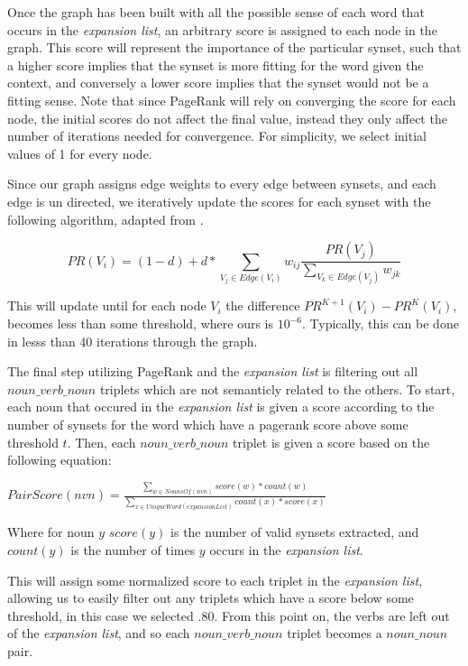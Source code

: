 \documentclass[11pt]{article}
\begin{document}
Once the graph has been built with all the possible sense of each word that
occurs in the \emph{expansion list}, an arbitrary score is assigned to each node in the
graph.  This score will represent the importance of the particular synset, such
that a higher score implies that the synset is more fitting for the word given
the context, and conversely a lower score implies that the synset would not be a
fitting sense.  Note that since PageRank will rely on converging the score for
each node, the initial scores do not affect the final value, instead they only
affect the number of iterations needed for convergence.  For simplicity, we
select initial values of 1 for every node.  

Since our graph assigns edge weights to every edge between 
synsets, and each edge is un directed, we iteratively update the scores for each
synset with the following algorithm, adapted from \cite{mihalcea06randomwalks}.   

\small
\[PR(V_i) = (1-d) + d*\sum_{V_j \in Edge(V_i)} w_{ij} \frac{PR(V_j)}
   {\displaystyle\sum_{V_k \in Edge(V_j)} w_{jk}}
   \]
\normalsize

This will update until for each node \(V_i\) the difference \(PR^{K+1}(V_i)
- PR^{K}(V_i)\), becomes less than some threshold, where ours is \(10^{-6}\).
Typically, this can be done in lesss than 40 iterations through the graph.

The final step utilizing PageRank and the \emph{expansion list} is filtering out all $noun\_verb\_noun$
triplets which are not semanticly related to the others.  To start, each noun that occured
in the \emph{expansion list} is given a score according to the number of synsets
for the word which have a pagerank score above some threshold \(t\).  Then, each
  $noun\_verb\_noun$ triplet is given a score based on the following equation:

\small
$ PairScore(nvn) = \frac {\displaystyle\sum_{w \in NounsOf(nvn)} {score(w) * count(w)}}
                          {\displaystyle\sum_{x \in UniqueWord(expansionList)}
                          {count(x)} * score(x)} $ 
\normalsize

Where for noun $y$ $score(y)$ is the number of valid synsets extracted, and $count(y)$ is the
number of times $y$ occurs in the \emph{expansion list}.

This will assign some normalized score to each triplet in the \emph{expansion
list},
allowing us to easily filter out any triplets which have a score below some
threshold, in this case we selected \(.80\).  From this point on, the verbs are
left out of the \emph{expansion list}, and so each $noun\_verb\_noun$ triplet becomes a
$noun\_noun$ pair.
\end{document}
